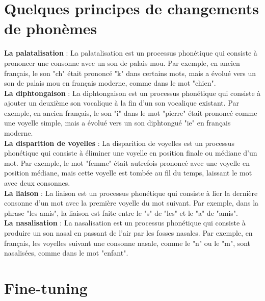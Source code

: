\documentclass[12pt, twoside]{report}
\begin{document}
\chapter{Quelques principes de changements de phonèmes} \label{changement_phonetique}

\textbf{La palatalisation} : La palatalisation est un processus phonétique qui consiste à prononcer une consonne avec un son de palais mou. Par exemple, en ancien français, le son "ch" était prononcé "k" dans certains mots, mais a évolué vers un son de palais mou en français moderne, comme dans le mot "chien".\\

\textbf{La diphtongaison} : La diphtongaison est un processus phonétique qui consiste à ajouter un deuxième son vocalique à la fin d'un son vocalique existant. Par exemple, en ancien français, le son "i" dans le mot "pierre" était prononcé comme une voyelle simple, mais a évolué vers un son diphtongué "ie" en français moderne.\\

\textbf{La disparition de voyelles} : La disparition de voyelles est un processus phonétique qui consiste à éliminer une voyelle en position finale ou médiane d'un mot. Par exemple, le mot "femme" était autrefois prononcé avec une voyelle en position médiane, mais cette voyelle est tombée au fil du temps, laissant le mot avec deux consonnes.\\

\textbf{La liaison} : La liaison est un processus phonétique qui consiste à lier la dernière consonne d'un mot avec la première voyelle du mot suivant. Par exemple, dans la phrase "les amis", la liaison est faite entre le "s" de "les" et le "a" de "amis".\\ 

\textbf{La nasalisation} : La nasalisation est un processus phonétique qui consiste à produire un son nasal en passant de l'air par les fosses nasales. Par exemple, en français, les voyelles suivant une consonne nasale, comme le "n" ou le "m", sont nasalisées, comme dans le mot "enfant".

\chapter{Fine-tuning} \label{fine-tuning}
\end{document}

